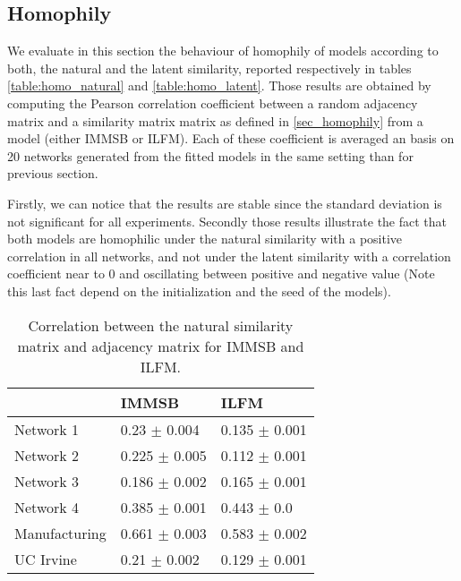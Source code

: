 \documentclass[a4paper, 12pt]{article}
\begin{document}
\subsection{Homophily}

We evaluate in this section the behaviour of homophily of models according to both, the natural and the latent similarity, reported respectively in tables \ref{table:homo_natural} and \ref{table:homo_latent}. Those results are obtained by computing the Pearson correlation coefficient between a random adjacency matrix and a similarity matrix matrix as defined in \ref{sec_homophily} from a model (either IMMSB or ILFM). Each of these coefficient is averaged an basis on 20 networks generated from the fitted models in the same setting than for previous section.

Firstly, we can notice that the results are stable since the standard deviation is not significant for all experiments. Secondly those results illustrate the fact that both models are homophilic under the natural similarity with a positive correlation in all networks,  and not under the latent similarity with a correlation coefficient near to 0 and oscillating between positive and negative value (Note this last fact depend on the initialization and the seed of the models).

\begin{table}
    \caption{Correlation between the natural similarity matrix and adjacency matrix for IMMSB and ILFM.}
    \begin{tabular}{lll}
    \hline
    & IMMSB   & ILFM  \\
    \hline
    Network 1     & 0.23 $\pm$ 0.004  & 0.135 $\pm$ 0.001      \\
    Network 2     & 0.225 $\pm$ 0.005 & 0.112 $\pm$ 0.001      \\
    Network 3     & 0.186 $\pm$ 0.002 & 0.165 $\pm$ 0.001      \\
    Network 4     & 0.385 $\pm$ 0.001 & 0.443 $\pm$ 0.0        \\
    Manufacturing & 0.661 $\pm$ 0.003 & 0.583 $\pm$ 0.002      \\
    UC Irvine     & 0.21 $\pm$ 0.002  & 0.129 $\pm$ 0.001      \\
    \hline
    \end{tabular}
\end{table}
\end{document}
